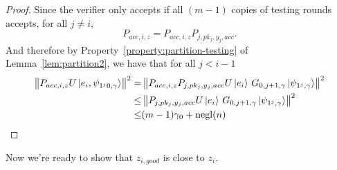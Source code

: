 \begin{proof}
	Since the verifier only accepts if all $(m-1)$ copies of testing rounds accepts, for all $j\neq i$,
	$$P_{acc,i,z}=P_{acc,i,z}P_{j,pk_j,y_j,acc}.$$
	And therefore by Property~\ref{property:partition-testing} of Lemma~\ref{lem:partition2}, we have that for all $j <i-1$
	\begin{align} \label{eq:rejected-d}
		\left\lVert P_{acc,i,z} U \ket{e_i, \psi_{1^j0,\gamma}}\right\rVert^2
		=& \left\lVert P_{acc,i,z}P_{j,pk_j,y_j,acc} U \ket{e_i}\, G_{0,j+1,\gamma}\ket{\psi_{1^j,\gamma}}  \right\rVert^2 \nonumber \\
		\leq& \left\lVert P_{j,pk_j,y_j,acc} U \ket{e_i}\, G_{0,j+1,\gamma}\ket{\psi_{1^j,\gamma}}  \right\rVert^2 \nonumber \\
		\leq& (m-1)\gamma_0+\operatorname{negl}(n)
	\end{align}
\end{proof}

Now we're ready to show that $z_{i, good}$ is close to $z_i$.

